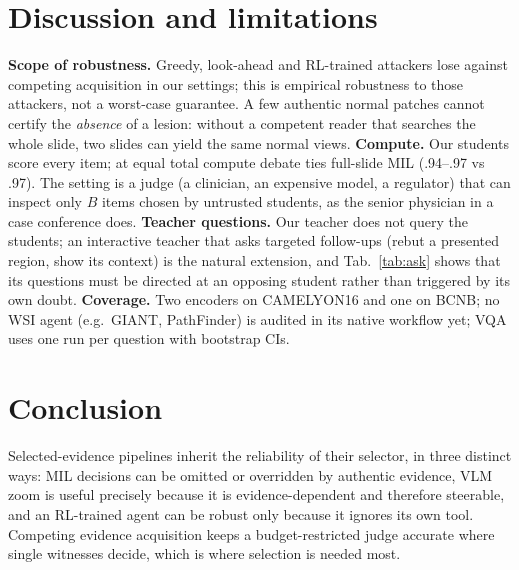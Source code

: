 \documentclass[10pt,twocolumn,letterpaper]{article}
\begin{document}
\section{Discussion and limitations}\label{sec:discussion}
\textbf{Scope of robustness.} Greedy, look-ahead and RL-trained attackers lose against competing acquisition in our settings; this is empirical robustness to those attackers, not a worst-case guarantee. A few authentic normal patches cannot certify the \emph{absence} of a lesion: without a competent reader that searches the whole slide, two slides can yield the same normal views. \textbf{Compute.} Our students score every item; at equal total compute debate ties full-slide MIL (.94--.97 vs .97). The setting is a judge (a clinician, an expensive model, a regulator) that can inspect only $B$ items chosen by untrusted students, as the senior physician in a case conference does. \textbf{Teacher questions.} Our teacher does not query the students; an interactive teacher that asks targeted follow-ups (rebut a presented region, show its context) is the natural extension, and Tab.~\ref{tab:ask} shows that its questions must be directed at an opposing student rather than triggered by its own doubt. \textbf{Coverage.} Two encoders on CAMELYON16 and one on BCNB; no WSI agent (e.g.\ GIANT, PathFinder) is audited in its native workflow yet; VQA uses one run per question with bootstrap CIs.

\section{Conclusion}
Selected-evidence pipelines inherit the reliability of their selector, in three distinct ways: MIL decisions can be omitted or overridden by authentic evidence, VLM zoom is useful precisely because it is evidence-dependent and therefore steerable, and an RL-trained agent can be robust only because it ignores its own tool. Competing evidence acquisition keeps a budget-restricted judge accurate where single witnesses decide, which is where selection is needed most.

{\small}
\end{document}
